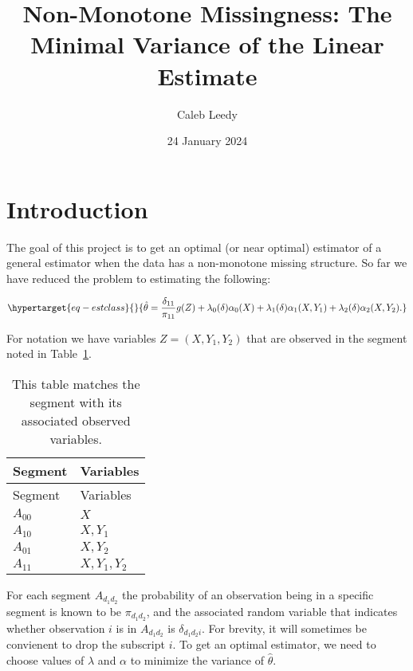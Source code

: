 \documentclass[
  letterpaper,
  DIV=11,
  numbers=noendperiod]{scrartcl}
\title{Non-Monotone Missingness: The Minimal Variance of the Linear
Estimate}
\author{Caleb Leedy}
\date{24 January 2024}
\begin{document}
\maketitle
\ifdefined\Shaded\renewenvironment{Shaded}{\begin{tcolorbox}[sharp corners, breakable, interior hidden, enhanced, borderline west={3pt}{0pt}{shadecolor}, boxrule=0pt, frame hidden]}{\end{tcolorbox}}\fi

\hypertarget{introduction}{%
\section{Introduction}\label{introduction}}

The goal of this project is to get an optimal (or near optimal)
estimator of a general estimator when the data has a non-monotone
missing structure. So far we have reduced the problem to estimating the
following:

\begin{equation}\protect\hypertarget{eq-estclass}{}{
\hat \theta = \frac{\delta_{11}}{\pi_{11}} g(Z) + 
\lambda_0(\delta) \alpha_0(X) +
\lambda_1(\delta) \alpha_1(X, Y_1) +
\lambda_2(\delta) \alpha_2(X, Y_2).
}\label{eq-estclass}\end{equation}

For notation we have variables \(Z = (X, Y_1, Y_2)\) that are observed
in the segment noted in Table~\ref{tbl-segments}.

\hypertarget{tbl-segments}{}
\begin{longtable}[]{@{}ll@{}}
\caption{\label{tbl-segments}This table matches the segment with its
associated observed variables.}\tabularnewline
\toprule\noalign{}
Segment & Variables \\
\midrule\noalign{}
\endfirsthead
\toprule\noalign{}
Segment & Variables \\
\midrule\noalign{}
\endhead
\bottomrule\noalign{}
\endlastfoot
\(A_{00}\) & \(X\) \\
\(A_{10}\) & \(X, Y_1\) \\
\(A_{01}\) & \(X, Y_2\) \\
\(A_{11}\) & \(X, Y_1, Y_2\) \\
\end{longtable}

For each segment \(A_{d_1 d_2}\) the probability of an observation being
in a specific segment is known to be \(\pi_{d_1 d_2}\), and the
associated random variable that indicates whether observation \(i\) is
in \(A_{d_1 d_2}\) is \(\delta_{d_1 d_2 i}\). For brevity, it will
sometimes be convienent to drop the subscript \(i\). To get an optimal
estimator, we need to choose values of \(\lambda\) and \(\alpha\) to
minimize the variance of \(\hat \theta\).
\end{document}
